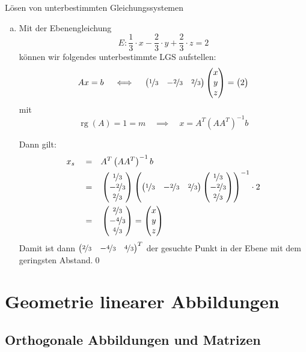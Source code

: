 \documentclass[german]{../spicker}
\newcommand{\vektor}[1]{\begin{pmatrix*}[c] #1 \end{pmatrix*}}
\newcommand{\rg}{\operatorname{rg}}
\begin{document}
\begin{example}{Lösen von unterbestimmten Gleichungssystemen}
\begin{enumerate}[a)]
              Setzen wir den Nullpunkt in die Ebene ein, erhalten wir den Abstand mit $d = 2$.\qed
        \item Mit der Ebenengleichung
              $$
                  E: \frac{1}{3} \cdot x - \frac{2}{3} \cdot y + \frac{2}{3} \cdot z = 2
              $$
              können wir folgendes unterbestimmte LGS aufstellen:
              $$
                  Ax = b \quad \iff \quad \vektor{\nicefrac{1}{3} & -\nicefrac{2}{3} & \nicefrac{2}{3}} \vektor{x \\ y \\ z} = \vektor{2}
              $$
              mit
              $$
                  \rg(A) = 1 = m \quad \implies \quad x = A^T \left(AA^T\right)^{-1}b
              $$

              Dann gilt:
              $$
                  \begin{aligned}
                      x_s \quad = \quad & A^T \left(AA^T\right)^{-1}b \\
                      = \quad           & \vektor{\nicefrac{1}{3}     \\ -\nicefrac{2}{3} \\ \nicefrac{2}{3}} \left( \vektor{\nicefrac{1}{3} & -\nicefrac{2}{3} & \nicefrac{2}{3}} \vektor{\nicefrac{1}{3} \\ -\nicefrac{2}{3} \\ \nicefrac{2}{3}} \right)^{-1} \cdot 2 \\
                      = \quad           & \vektor{\nicefrac{2}{3}     \\ -\nicefrac{4}{3} \\ \nicefrac{4}{3}} = \vektor{x\\y\\z}
                  \end{aligned}
              $$
              Damit ist dann $\vektor{\nicefrac{2}{3} & -\nicefrac{4}{3} & \nicefrac{4}{3}}^T$ der gesuchte Punkt in der Ebene mit dem geringsten Abstand.\qed
    \end{enumerate}
\end{example}
\section{Geometrie linearer Abbildungen}

\subsection{Orthogonale Abbildungen und Matrizen}
\end{document}
